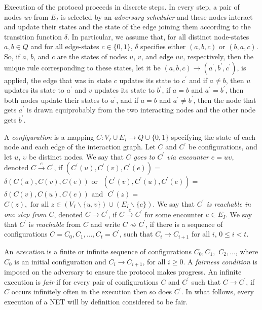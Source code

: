 \documentclass[preprint]{elsarticle}
\newcommand{\rsa}{\rightsquigarrow}
\newcommand{\bs}{\backslash}
\begin{document}
Execution of the protocol proceeds in discrete steps. In every step, a pair of nodes $uv$ from $E_I$ is selected by an \emph{adversary scheduler} and these nodes interact and update their states and the state of the edge joining them according to the transition function $\delta$. In particular, we assume that, for all distinct node-states $a,b\in Q$ and for all edge-states $c\in\{0,1\}$, $\delta$ specifies either $(a,b,c)$ or $(b,a,c)$. So, if $a$, $b$, and $c$ are the states of nodes $u$, $v$, and edge $uv$, respectively, then the unique rule corresponding to these states, let it be $(a,b,c)\rightarrow (a^\prime,b^\prime,c^\prime)$, is applied, the edge that was in state $c$ updates its state to $c^\prime$ and if $a\neq b$, then $u$ updates its state to $a^\prime$ and $v$ updates its state to $b^\prime$, if $a=b$ and $a^\prime=b^\prime$, then both nodes update their states to $a^\prime$, and if $a=b$ and $a^\prime\neq b^\prime$, then the node that gets $a^\prime$ is drawn equiprobably from the two interacting nodes and the other node gets $b^\prime$. 

A \emph{configuration} is a mapping $C : V_I\cup E_I \rightarrow Q\cup \{0,1\}$ specifying the state of each node and each edge of the interaction graph. Let $C$ and $C^{\prime}$ be configurations, and let $u$, $\upsilon$ be distinct nodes. We say that \emph{$C$ goes to $C^{\prime}$ via encounter $e=u\upsilon$}, denoted $C \stackrel{e}\rightarrow C^{\prime}$, if $(C^{\prime}(u),C^{\prime}(v),C^{\prime}(e))=$ $\delta(C(u),C(v),C(e)) \text{ or }$ $(C^{\prime}(v),C^{\prime}(u),C^{\prime}(e))=$ $\delta(C(v),C(u),C(e)) \text{ and }$ $C^{\prime}(z)=$ $C(z), \mbox{ for all } z\in (V_I\bs\{u,v\})\cup (E_I\bs\{e\})$. We say that \emph{$C^\prime$ is reachable in one step from $C$}, denoted $C\rightarrow C^{\prime}$, if $C \stackrel{e}\rightarrow C^{\prime}$ for some encounter $e\in E_I$. We say that $C^{\prime}$ is \emph{reachable} from $C$ and write $C\rsa C^{\prime}$, if there is a sequence of configurations $C=C_{0},C_{1},\ldots,C_{t}=C^{\prime}$, such that $C_{i}\rightarrow C_{i+1}$ for all $i$, $0\leq i <t$.

An \emph{execution} is a finite or infinite sequence of configurations $C_{0},C_{1},$ $C_{2},\ldots$, where $C_{0}$ is an initial configuration and $C_{i}\rightarrow C_{i+1}$, for all $i\geq 0$. A \emph{fairness condition} is imposed on the adversary to ensure the protocol makes progress. An infinite execution is \emph{fair} if for every pair of configurations $C$ and $C^{\prime}$ such that $C\rightarrow C^{\prime}$, if $C$ occurs infinitely often in the execution then so does $C^{\prime}$. In what follows, every execution of a NET will by definition considered to be fair.
\end{document}
